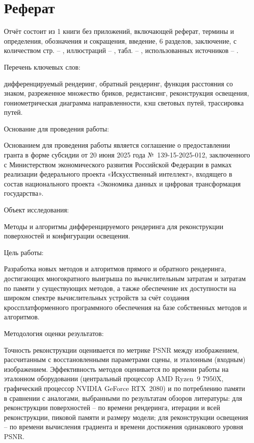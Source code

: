 \chapter*{Реферат}

Отчёт состоит из 1 книги без приложений, включающей реферат, термины и определения, обозначения и сокращения, введение, 6 разделов, заключение, с количеством стр. -- \thelastpage, иллюстраций -- , табл. -- , использованных источников -- .

Перечень ключевых слов:

дифференцируемый рендеринг, обратный рендеринг, функция расстояния со знаком, разреженное множество бриков, редистансинг, реконструкция освещения, гониометрическая диаграмма направленности, кэш световых путей, трассировка путей.

Основание для проведения работы:

Основанием для проведения работы является соглашение о предоставлении гранта в форме субсидии от 20 июня 2025 года №~139-15-2025-012, заключенного с Министерством экономического развития Российской Федерации в рамках реализации федерального проекта «Искусственный интеллект», входящего в состав национального проекта «Экономика данных и цифровая трансформация государства».

Объект исследования:

Методы и алгоритмы дифференцируемого рендеринга для реконструкции поверхностей и конфигурации освещения.

Цель работы:

Разработка новых методов и алгоритмов прямого и обратного рендеринга, достигающих многократного выигрыша по вычислительным затратам и затратам по памяти у существующих методов, а также обеспечение их доступности на широком спектре вычислительных устройств за счёт создания кроссплатформенного программного обеспечения на базе собственных методов и алгоритмов.

Методология оценки результатов:

Точность реконструкции оценивается по метрике PSNR между изображением, рассчитанным с восстановленными параметрами сцены, и эталонным (входным) изображением. Эффективность методов оценивается по времени работы на эталонном оборудовании (центральный процессор AMD Ryzen~9 7950X, графический процессор NVIDIA GeForce RTX~2080) и по потреблению памяти в сравнении с аналогами, выбранными по результатам обзоров литературы: для реконструкции поверхностей -- по времени рендеринга, итерации и всей реконструкции, пиковой памяти и размеру модели; для реконструкции освещения -- по времени вычисления градиента и времени достижения одинакового уровня PSNR.

